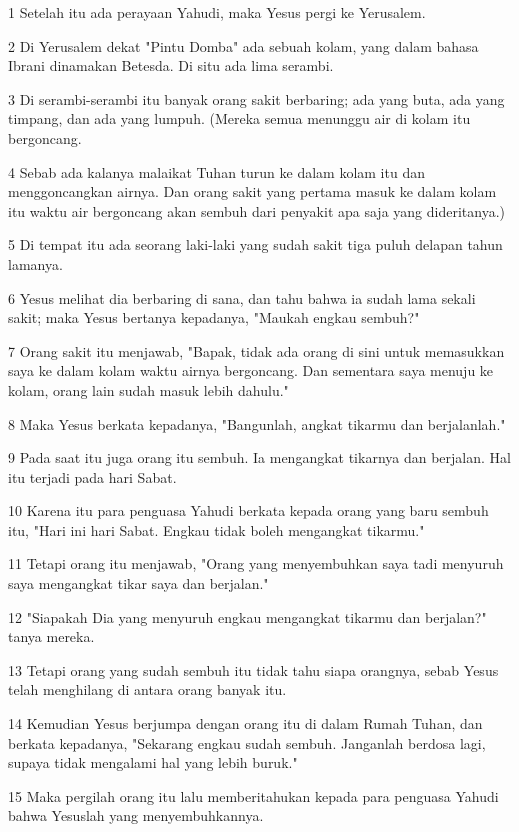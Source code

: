 \par 1 Setelah itu ada perayaan Yahudi, maka Yesus pergi ke Yerusalem.
\par 2 Di Yerusalem dekat "Pintu Domba" ada sebuah kolam, yang dalam bahasa Ibrani dinamakan Betesda. Di situ ada lima serambi.
\par 3 Di serambi-serambi itu banyak orang sakit berbaring; ada yang buta, ada yang timpang, dan ada yang lumpuh. (Mereka semua menunggu air di kolam itu bergoncang.
\par 4 Sebab ada kalanya malaikat Tuhan turun ke dalam kolam itu dan menggoncangkan airnya. Dan orang sakit yang pertama masuk ke dalam kolam itu waktu air bergoncang akan sembuh dari penyakit apa saja yang dideritanya.)
\par 5 Di tempat itu ada seorang laki-laki yang sudah sakit tiga puluh delapan tahun lamanya.
\par 6 Yesus melihat dia berbaring di sana, dan tahu bahwa ia sudah lama sekali sakit; maka Yesus bertanya kepadanya, "Maukah engkau sembuh?"
\par 7 Orang sakit itu menjawab, "Bapak, tidak ada orang di sini untuk memasukkan saya ke dalam kolam waktu airnya bergoncang. Dan sementara saya menuju ke kolam, orang lain sudah masuk lebih dahulu."
\par 8 Maka Yesus berkata kepadanya, "Bangunlah, angkat tikarmu dan berjalanlah."
\par 9 Pada saat itu juga orang itu sembuh. Ia mengangkat tikarnya dan berjalan. Hal itu terjadi pada hari Sabat.
\par 10 Karena itu para penguasa Yahudi berkata kepada orang yang baru sembuh itu, "Hari ini hari Sabat. Engkau tidak boleh mengangkat tikarmu."
\par 11 Tetapi orang itu menjawab, "Orang yang menyembuhkan saya tadi menyuruh saya mengangkat tikar saya dan berjalan."
\par 12 "Siapakah Dia yang menyuruh engkau mengangkat tikarmu dan berjalan?" tanya mereka.
\par 13 Tetapi orang yang sudah sembuh itu tidak tahu siapa orangnya, sebab Yesus telah menghilang di antara orang banyak itu.
\par 14 Kemudian Yesus berjumpa dengan orang itu di dalam Rumah Tuhan, dan berkata kepadanya, "Sekarang engkau sudah sembuh. Janganlah berdosa lagi, supaya tidak mengalami hal yang lebih buruk."
\par 15 Maka pergilah orang itu lalu memberitahukan kepada para penguasa Yahudi bahwa Yesuslah yang menyembuhkannya.
